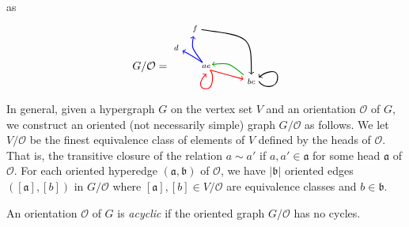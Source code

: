 \documentclass[ALCO,ThmDefs,Unicode,epreuves]{cedram}
\begin{document}
\begin{exam}
 as 
 $${ G/\mathcal{O}}=
\begin{tikzpicture}[scale=1.2,baseline=.5cm]
	\node (a) at (.3,.5) {$\scriptstyle ae$};
	\node (b) at (1.5,.1) {$\scriptstyle bc$};
	\node (d) at (-.5,1) {$\scriptstyle d$};
	\node (f) at (0,1.5) {$\scriptstyle f$};
	\draw [thick,color=red,->] (.4,.4).. controls (.5,.3) and (.5,-.1)..(.3,-.1) .. controls (.1,-.1) and (.1,.1).. (.3,.3); 
	\draw [thick,color=red,->] (.4,.4) -- (b); 
	\draw [thick,color=green!60!black,->] (b).. controls (.9,.6) .. (.45,.55); 
	\draw [thick,color=blue,->] (.2,.6).. controls (-.1,.8) .. (d); 
	\draw [thick,color=blue,->] (.2,.6).. controls (-0.1,1) .. (f); 
	\draw [thick,->] (f) .. controls (1.5,1.3) .. (b); 
	\draw [thick,->] (1.7,.1) .. controls (1.8,-.1) and (2.2,-.1) ..(2.2,.2) .. controls (2.2,.5) and (1.8,.3).. (1.7,.2); 
\end{tikzpicture} 
$$
\end{exam}

In general, given a hypergraph $G$ on the vertex set $V$ and an orientation $\mathcal{O}$ of $G$, we construct an oriented (not necessarily simple) graph $G/\mathcal{O}$ as follows. 
We let $V/\mathcal{O}$ be the finest equivalence class of elements of $V$ defined by the heads of $\mathcal{O}$.
That is, the transitive closure of the relation $a\sim a'$ if $a,a'\in \mathfrak{a}$ for some head $\mathfrak{a}$ of $\mathcal{O}$.
For each oriented hyperedge $(\mathfrak{a},\mathfrak{b})$ of $\mathcal{O}$, we have $|\mathfrak{b}|$ oriented edges $([\mathfrak{a}],[b])$ in $G/\mathcal{O}$ 
where $[\mathfrak{a}],[b]\in V/\mathcal{O}$ are equivalence classes and $b\in \mathfrak{b}$. 

\begin{defi} An orientation $\mathcal{O}$ of $G$ is \emph{acyclic} if the oriented graph $G/\mathcal{O}$ has no cycles.
\end{defi}
\end{document}
